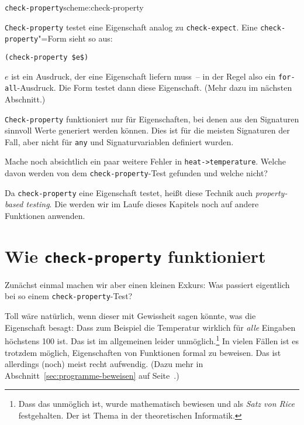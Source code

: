 \begin{feature}{\lstinline{check-property}}{scheme:check-property}

\lstinline{Check-property}
testet eine Eigenschaft analog zu \lstinline{check-expect}.  Eine
\lstinline{check-property}"=Form sieht so aus:
%
\begin{lstlisting}
(check-property $e$) 
\end{lstlisting}
%
$e$ ist ein Ausdruck, der eine Eigenschaft liefern muss~-- in der Regel
also ein \lstinline{for-all}-Ausdruck.  Die Form testet dann diese
Eigenschaft.  (Mehr dazu im nächsten Abschnitt.)

\lstinline{Check-property} funktioniert nur für Eigenschaften, bei
denen aus den Signaturen sinnvoll Werte generiert werden können.  Dies
ist für die meisten Signaturen der Fall, aber nicht für
\lstinline{any} und Signaturvariablen definiert wurden.
\end{feature}

\begin{aufgabeinline}
  Mache noch absichtlich ein paar weitere Fehler in
  \lstinline{heat->temperature}.  Welche davon werden von dem
  \lstinline{check-property}-Test gefunden und welche nicht?
\end{aufgabeinline}

Da \lstinline{check-property} eine Eigenschaft testet, heißt diese
Technik auch \textit{property-based testing}.  Die werden wir im Laufe dieses Kapitels noch auf andere
Funktionen anwenden.

\section{Wie \lstinline{check-property} funktioniert}

Zunächst einmal machen wir aber einen kleinen Exkurs: Was passiert
eigentlich bei so einem \lstinline{check-property}-Test?

Toll wäre natürlich, wenn dieser mit Gewissheit sagen könnte, was die
Eigenschaft besagt: Dass zum Beispiel die Temperatur wirklich für
\emph{alle} Eingaben höchstens 100 ist.  Das ist im allgemeinen leider
unmöglich.\footnote{Dass das unmöglich ist, wurde mathematisch
  bewiesen und als \textit{Satz von Rice} festgehalten.  Der ist Thema
  in der theoretischen Informatik.}  In vielen Fällen ist es trotzdem
möglich, Eigenschaften von Funktionen formal zu beweisen.  Das ist
allerdings (noch) meist recht aufwendig.  (Dazu mehr in
Abschnitt~\ref{sec:programme-beweisen} auf
Seite~\pageref{sec:programme-beweisen}.)

